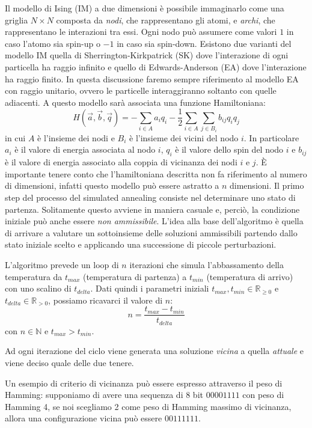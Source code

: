 Il modello di Ising (IM) a due dimensioni è possibile immaginarlo come una griglia $N \times N$ composta da \textit{nodi}, che rappresentano gli atomi, e \textit{archi}, che rappresentano le interazioni tra essi. Ogni nodo può assumere come valori $1$ in caso l'atomo sia spin-up o $-1$ in caso sia spin-down. Esistono due varianti del modello IM quella di Sherrington-Kirkpatrick (SK) dove l'interazione di ogni particella ha raggio infinito e quello di  Edwards-Anderson (EA) dove l'interazione ha raggio finito. In questa discussione faremo sempre riferimento al modello EA con raggio unitario, ovvero le particelle interaggiranno soltanto con quelle adiacenti. A questo modello sarà associata una funzione Hamiltoniana:
$$ H(\vec{a}, \vec{b}, \vec{q}) = - \sum_{i \in A } a_i q_i - \frac{1}{2} \sum_{i \in A} \sum_{j \in B_i} b_{ij} q_i q_j $$
in cui $A$ è l'insieme dei nodi e $B_i$ è l'insieme dei vicini del nodo $i$. In particolare $a_i$ è il valore di energia associata al nodo $i$, $q_i$ è il valore dello spin del nodo $i$ e $b_{ij}$ è il valore di energia associato alla coppia di vicinanza dei nodi $i$ e $j$. È importante tenere conto che l'hamiltoniana descritta non fa riferimento al numero di dimensioni, infatti questo modello può essere astratto a $n$ dimensioni.
Il primo step del processo del simulated annealing consiste nel determinare uno stato di
partenza. Solitamente questo avviene in maniera casuale e, perciò, la condizione iniziale può anche essere \textit{non ammissibile}. L’idea alla base dell’algoritmo è quella di arrivare a valutare un sottoinsieme delle soluzioni ammissibili partendo dallo stato iniziale scelto e applicando una successione di piccole perturbazioni.

L'algoritmo prevede un loop di $n$ iterazioni che simula l'abbassamento della temperatura da $t_{max}$ (temperatura di partenza) a $t_{min}$ (temperatura di arrivo) con uno scalino di $t_{delta}$. Dati quindi i parametri iniziali $t_{max}, t_{min} \in \mathbb{R}_{\geq 0}$ e $ t_{delta} \in \mathbb{R}_{> 0}$, possiamo ricavarci il valore di $n$:
$$n = \frac{t_{max}-t_{min}}{t_{delta}}$$
con $n \in \mathbb{N}$ e $t_{max} > t_{min}$.

Ad ogni iterazione del ciclo viene generata una soluzione \textit{vicina} a quella \textit{attuale} e viene deciso quale delle due tenere.

Un esempio di criterio di vicinanza può essere espresso attraverso il peso di Hamming: supponiamo di avere una sequenza di 8 bit $00001111$ con peso di Hamming 4, se noi scegliamo 2 come peso di Hamming massimo di vicinanza, allora una configurazione vicina può essere $00111111$.

